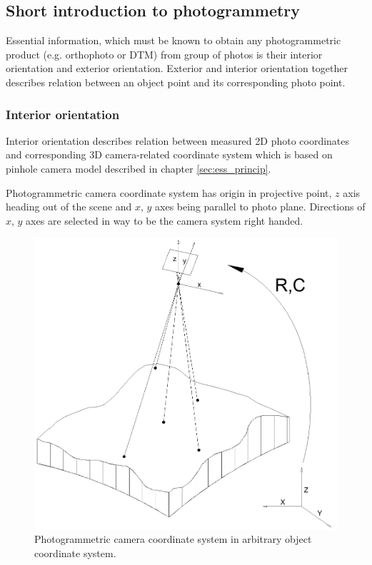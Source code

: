 \documentclass[a4paper,12pt]{article}
\begin{document}
\subsection{Short introduction to photogrammetry}

Essential information, which must be known to obtain any photogrammetric
 product (e.g. orthophoto or DTM) from group of photos is their interior orientation and exterior orientation.
Exterior and interior orientation together describes relation between an object point and
its corresponding photo point.

\subsubsection{Interior orientation}

Interior orientation describes relation between measured 2D photo coordinates 
and corresponding 3D camera-related coordinate system which is based on pinhole camera model described in chapter \ref{sec:ess_princip}.

Photogrammetric camera coordinate system has origin in projective point,
$z$ axis heading out of the scene  and $x$, $y$ axes being parallel to photo plane. Directions of 
$x$, $y$ axes are selected in way to be the camera system right handed.

\begin{figure}[h]
    \centering
    \includegraphics[scale=0.3]{figures/photogrammetric_model.png}
    \caption{Photogrammetric camera coordinate system in arbitrary object coordinate system.}
    \label{fig:ph_model}
\end{figure}
\end{document}
